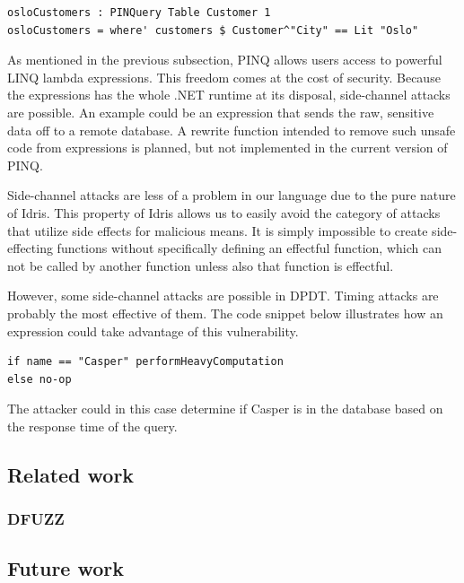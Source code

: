 \documentclass[12pt]{article}
\begin{document}
\begin{lstlisting}[caption = Where query in DPDT, captionpos=b]
osloCustomers : PINQuery Table Customer 1
osloCustomers = where' customers $ Customer^"City" == Lit "Oslo"
\end{lstlisting}

As mentioned in the previous subsection, PINQ allows users access to powerful LINQ lambda expressions.
This freedom comes at the cost of security.
Because the expressions has the whole .NET runtime at its disposal, side-channel attacks are possible.
An example could be an expression that sends the raw, sensitive data off to a remote database.
A rewrite function intended to remove such unsafe code from expressions is planned, but not implemented in the current version of PINQ.

Side-channel attacks are less of a problem in our language due to the pure nature of Idris.
This property of Idris allows us to easily avoid the category of attacks that utilize side effects for malicious means.
It is simply impossible to create side-effecting functions without specifically defining an effectful function, which can not be called by another function unless also that function is effectful.

However, some side-channel attacks are possible in DPDT.
Timing attacks are probably the most effective of them.
The code snippet below illustrates how an expression could take advantage of this vulnerability.

\begin{lstlisting}
if name == "Casper" performHeavyComputation 
else no-op
\end{lstlisting}

The attacker could in this case determine if Casper is in the database based on the response time of the query.

\subsection{Related work}\label{sec:related_work}

\subsubsection{DFUZZ}


\subsection{Future work}\label{sec:future_work}
\end{document}
